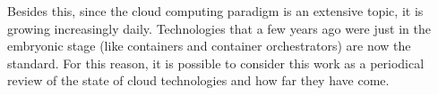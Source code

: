 Besides this, since the cloud computing paradigm is an extensive topic, it is
growing increasingly daily. Technologies that a few years ago were just in
the embryonic stage (like containers and container orchestrators) are now the
standard. For this reason, it is possible to consider this work as a periodical
review of the state of cloud technologies and how far they have come.









